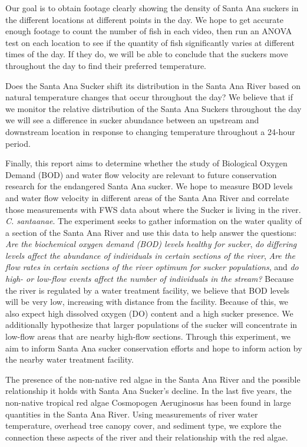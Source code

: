 \documentclass{article}\usepackage[]{graphicx}\usepackage[]{color}
\begin{document}
Our goal is to obtain footage clearly showing the density of Santa Ana suckers in the different locations at different points in the day.  We hope to get accurate enough footage to count the number of fish in each video, then run an ANOVA test on each location to see if the quantity of fish significantly varies at different times of the day.  If they do, we will be able to conclude that the suckers move throughout the day to find their preferred temperature.

Does the Santa Ana Sucker shift its distribution in the Santa Ana River based on natural temperature changes that occur throughout the day? We believe that if we monitor the relative distribution of the Santa Ana Suckers throughout the day we will see a difference in sucker abundance between an upstream and downstream location in response to changing temperature throughout a 24-hour period.

Finally, this report aims to determine whether the study of Biological Oxygen Demand (BOD) and water flow velocity are relevant to future conservation research for the endangered Santa Ana sucker. We hope to measure BOD levels and water flow velocity in different areas of the Santa Ana River and correlate those measurements with FWS data about where the Sucker is living in the river. \emph{C. santaanae}. The experiment seeks to gather information on the water quality of a section of the Santa Ana River and use this data to help answer the questions: \emph{Are the biochemical oxygen demand (BOD) levels healthy for sucker}, \emph{do differing levels affect the  abundance of individuals in certain sections of the river}, \emph{Are the flow rates in certain sections of the river optimum for sucker populations}, and \emph{do high- or low-flow events affect the number of individuals in the stream?} Because the river is regulated by a water treatment facility, we believe that BOD levels will be very low, increasing with distance from the facility. Because of this, we also expect high dissolved oxygen (DO) content and a high sucker presence. We additionally hypothesize that larger populations of the sucker will concentrate in low-flow areas that are nearby high-flow sections. Through this experiment, we aim to inform Santa Ana sucker conservation efforts and hope to inform action by the nearby water treatment facility. 

The presence of the non-native red algae in the Santa Ana River and the possible relationship it holds with Santa Ana Sucker's decline. In the last five years, the non-native tropical red algae Cosmopogen Aeruginosus has been found in large quantities in the Santa Ana River. Using measurements of river water temperature, overhead tree canopy cover, and sediment type, we explore the connection these aspects of the river and their relationship with the red algae.
\end{document}
